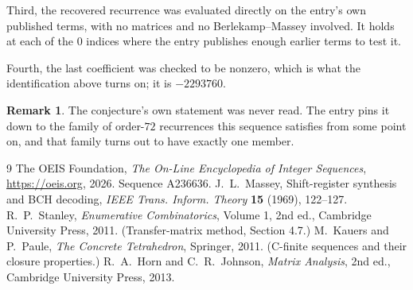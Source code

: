 \documentclass[11pt,a4paper]{article}
\theoremstyle{plain}
\theoremstyle{definition}
\newtheorem{remark}[theorem]{Remark}
\begin{document}
Third, the recovered recurrence was evaluated directly on the entry's own published terms, with
no matrices and no Berlekamp--Massey involved. It holds at each of the $0$ indices where
the entry publishes enough earlier terms to test it.

Fourth, the last coefficient was checked to be nonzero, which is what the identification above
turns on; it is $-2293760$.

\begin{remark}
The conjecture's own statement was never read. The entry pins it down to the family of
order-$72$ recurrences this sequence satisfies from some point on, and that family turns
out to have exactly one member.
\end{remark}

\begin{thebibliography}{9}
 The OEIS Foundation, \emph{The On-Line Encyclopedia of Integer
Sequences}, \url{https://oeis.org}, 2026. Sequence A236636.
 J.~L.~Massey, Shift-register synthesis and BCH decoding, \emph{IEEE
Trans. Inform. Theory} \textbf{15} (1969), 122--127.
 R.~P.~Stanley, \emph{Enumerative Combinatorics}, Volume 1, 2nd ed.,
Cambridge University Press, 2011. (Transfer-matrix method, Section 4.7.)
 M.~Kauers and P.~Paule, \emph{The Concrete Tetrahedron}, Springer, 2011.
(C-finite sequences and their closure properties.)
 R.~A.~Horn and C.~R.~Johnson, \emph{Matrix Analysis}, 2nd ed., Cambridge
University Press, 2013.
\end{thebibliography}
\end{document}
